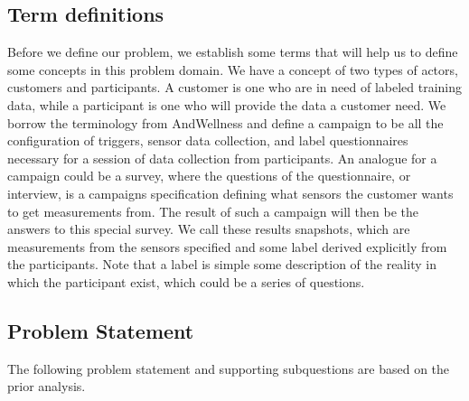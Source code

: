 \subsection{Term definitions}
Before we define our problem, we establish some terms that will help us to define some concepts in this problem domain. We have a concept of two types of actors, customers and participants. A customer is one who are in need of labeled training data, while a participant is one who will provide the data a customer need. We borrow the terminology from AndWellness \parencite{hicks2010andwellness} and define a campaign to be all the configuration of triggers, sensor data collection, and label questionnaires necessary for a session of data collection from participants. An analogue for a campaign could be a survey, where the questions of the questionnaire, or interview, is a campaigns specification defining what sensors the customer wants to get measurements from. The result of such a campaign will then be the answers to this special survey. We call these results snapshots, which are measurements from the sensors specified and some label derived explicitly from the participants. Note that a label is simple some description of the reality in which the participant exist, which could be a series of questions.

\subsection{Problem Statement}
\label{sub:problem_statement}
The following problem statement and supporting subquestions are based on the prior analysis.
\\\\



